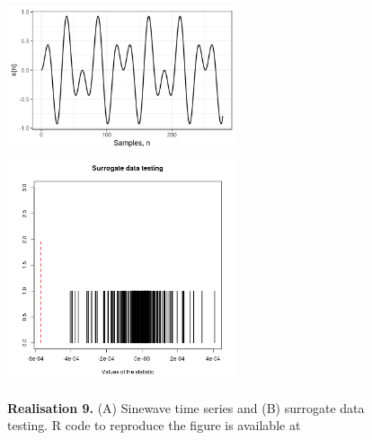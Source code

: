 \documentclass[11pt]{article}
\newcommand{\R}{\textsf{R}\xspace}
\newcommand{\codeicon}{{\color{linkcolor}\faFileCodeO}}
\newcommand{\codelink}[1]{\href{#1}{\codeicon}}
\begin{document}
\begin{figure}
\centering
\includegraphics[width=0.6\textwidth]{r9_ts_sinewaves_window_length_278} %
\includegraphics[width=0.6\textwidth]{r9_sdt_sinewaves_window_length_278} %
    \caption[]{
	{\bf Realisation 9.}
	(A) Sinewave time series and (B) surrogate data testing.
	\R code to reproduce the figure is available at 
	\codelink{https://github.com/mxochicale-phd/thesis/blob/master/0_code_data/1_code/x_surrogate/00_timeseries/code/B_.R}
	}
    \label{fig:thesis-outline}
\end{figure}












\end{document}
